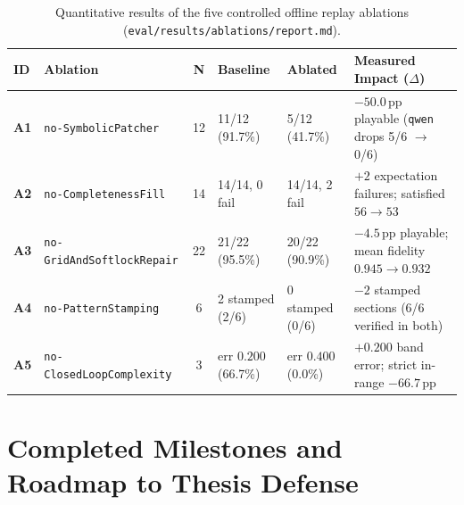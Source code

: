 \documentclass[11pt,a4paper]{report}
\theoremstyle{definition}
\theoremstyle{remark}
\begin{document}
\begin{table}[htbp]
\centering
\small
\caption{Quantitative results of the five controlled offline replay ablations (\texttt{eval/results/ablations/report.md}).}
\label{tab:ablations}
\begin{tabularx}{\textwidth}{l l c l l X}
\toprule
\textbf{ID} & \textbf{Ablation} & \textbf{N} & \textbf{Baseline} & \textbf{Ablated} & \textbf{Measured Impact ($\Delta$)} \\
\midrule
\textbf{A1} & \texttt{no-SymbolicPatcher} & 12 & 11/12 (91.7\%) & 5/12 (41.7\%) & $-50.0$\,pp playable (\texttt{qwen} drops 5/6 $\to$ 0/6) \\
\textbf{A2} & \texttt{no-CompletenessFill} & 14 & 14/14, 0 fail & 14/14, 2 fail & $+2$ expectation failures; satisfied $56 \to 53$ \\
\textbf{A3} & \texttt{no-GridAndSoftlockRepair} & 22 & 21/22 (95.5\%) & 20/22 (90.9\%) & $-4.5$\,pp playable; mean fidelity $0.945 \to 0.932$ \\
\textbf{A4} & \texttt{no-PatternStamping} & 6 & 2 stamped (2/6) & 0 stamped (0/6) & $-2$ stamped sections (6/6 verified in both) \\
\textbf{A5} & \texttt{no-ClosedLoopComplexity} & 3 & err $0.200$ (66.7\%) & err $0.400$ (0.0\%) & $+0.200$ band error; strict in-range $-66.7$\,pp \\
\bottomrule
\end{tabularx}
\end{table}

\chapter{Completed Milestones and Roadmap to Thesis Defense}
\label{chap:status}
\end{document}

